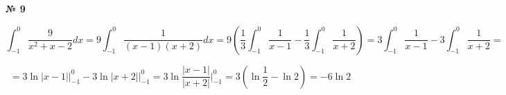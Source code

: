 \documentclass{article}
\begin{document}
\textbf{№ 9} 

$$ \int_{-1}^{0} \frac{9}{x^2+x-2} dx 
= 9\int_{-1}^{0} \frac{1}{(x-1)(x+2)} dx 
= 9 \left( \frac{1}{3} \int_{-1}^{0} \frac{1}{x-1} - \frac{1}{3} \int_{-1}^{0} \frac{1}{x+2} \right) 
= 3\int_{-1}^{0} \frac{1}{x-1} - 3\int_{-1}^{0} \frac{1}{x+2} 
= $$

$$ = 3\ln{\left| x-1 \right|} \bigg\vert_{-1}^{0} - 3\ln{\left| x+2 \right|} \bigg\vert_{-1}^{0}
= 3\ln{\frac{\left| x-1 \right|}{\left| x+2 \right|}} \bigg\vert_{-1}^{0} 
= 3 \left( \ln{\frac{1}{2}} - \ln{2} \right)
= -6 \ln{2} $$
\end{document}
